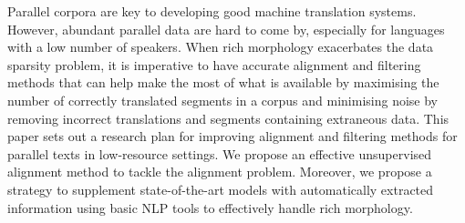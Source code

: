 Parallel corpora are key to developing good machine translation systems. However, abundant parallel data are hard to come by, especially for languages with a low number of speakers. When rich morphology exacerbates the data sparsity problem, it is imperative to have accurate alignment and filtering methods that can help make the most of what is available by maximising the number of correctly translated segments in a corpus and minimising noise by removing incorrect translations and segments containing extraneous data. This paper sets out a research plan for improving alignment and filtering methods for parallel texts in low-resource settings. We propose an effective unsupervised alignment method to tackle the alignment problem. Moreover, we propose a strategy to supplement state-of-the-art models with automatically extracted information using basic NLP tools to effectively handle rich morphology.
